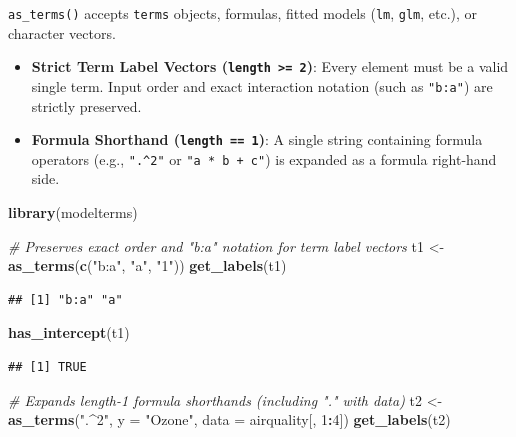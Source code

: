 \documentclass[
]{article}
\newenvironment{Shaded}{\begin{snugshade}}{\end{snugshade}}
\newcommand{\AttributeTok}[1]{\textcolor[rgb]{0.13,0.29,0.53}{#1}}
\newcommand{\CommentTok}[1]{\textcolor[rgb]{0.56,0.35,0.01}{\textit{#1}}}
\newcommand{\DecValTok}[1]{\textcolor[rgb]{0.00,0.00,0.81}{#1}}
\newcommand{\FunctionTok}[1]{\textcolor[rgb]{0.13,0.29,0.53}{\textbf{#1}}}
\newcommand{\NormalTok}[1]{#1}
\newcommand{\OtherTok}[1]{\textcolor[rgb]{0.56,0.35,0.01}{#1}}
\newcommand{\SpecialCharTok}[1]{\textcolor[rgb]{0.81,0.36,0.00}{\textbf{#1}}}
\newcommand{\StringTok}[1]{\textcolor[rgb]{0.31,0.60,0.02}{#1}}
\providecommand{\tightlist}{%
  \setlength{\itemsep}{0pt}\setlength{\parskip}{0pt}}
\begin{document}
\texttt{as\_terms()} accepts \texttt{terms} objects, formulas, fitted
models (\texttt{lm}, \texttt{glm}, etc.), or character vectors.

\begin{itemize}
\tightlist
\item
  \textbf{Strict Term Label Vectors
  (\texttt{length\ \textgreater{}=\ 2})}: Every element must be a valid
  single term. Input order and exact interaction notation (such as
  \texttt{"b:a"}) are strictly preserved.
\item
  \textbf{Formula Shorthand (\texttt{length\ ==\ 1})}: A single string
  containing formula operators (e.g., \texttt{".\^{}2"} or
  \texttt{"a\ *\ b\ +\ c"}) is expanded as a formula right-hand side.
\end{itemize}

\begin{Shaded}
\begin{Highlighting}[]
\FunctionTok{library}\NormalTok{(modelterms)}

\CommentTok{\# Preserves exact order and "b:a" notation for term label vectors}
\NormalTok{t1 }\OtherTok{\textless{}{-}} \FunctionTok{as\_terms}\NormalTok{(}\FunctionTok{c}\NormalTok{(}\StringTok{"b:a"}\NormalTok{, }\StringTok{"a"}\NormalTok{, }\StringTok{"1"}\NormalTok{))}
\FunctionTok{get\_labels}\NormalTok{(t1)}
\end{Highlighting}
\end{Shaded}

\begin{verbatim}
## [1] "b:a" "a"
\end{verbatim}

\begin{Shaded}
\begin{Highlighting}[]
\FunctionTok{has\_intercept}\NormalTok{(t1)}
\end{Highlighting}
\end{Shaded}

\begin{verbatim}
## [1] TRUE
\end{verbatim}

\begin{Shaded}
\begin{Highlighting}[]
\CommentTok{\# Expands length{-}1 formula shorthands (including "." with data)}
\NormalTok{t2 }\OtherTok{\textless{}{-}} \FunctionTok{as\_terms}\NormalTok{(}\StringTok{".\^{}2"}\NormalTok{, }\AttributeTok{y =} \StringTok{"Ozone"}\NormalTok{, }\AttributeTok{data =}\NormalTok{ airquality[, }\DecValTok{1}\SpecialCharTok{:}\DecValTok{4}\NormalTok{])}
\FunctionTok{get\_labels}\NormalTok{(t2)}
\end{Highlighting}
\end{Shaded}
\end{document}

